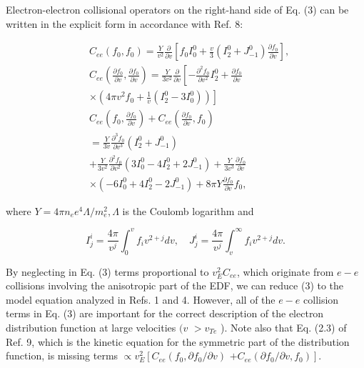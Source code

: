 \documentclass[10pt]{article}
\begin{document}
Electron-electron collisional operators on the right-hand side of Eq. (3) can be written in the explicit form in accordance with Ref. 8:

$$
\begin{aligned}
& C_{e e}\left(f_{0}, f_{0}\right)=\frac{Y}{v^{2}} \frac{\partial}{\partial v}\left[f_{0} I_{0}^{0}+\frac{v}{3}\left(I_{2}^{0}+J_{-1}^{0}\right) \frac{\partial f_{0}}{\partial v}\right], \\
& C_{e e}\left(\frac{\partial f_{0}}{\partial v}, \frac{\partial f_{0}}{\partial v}\right)=\frac{Y}{3 v^{2}} \frac{\partial}{\partial v}\left[-\frac{\partial^{2} f_{0}}{\partial v^{2}} I_{2}^{0}+\frac{\partial f_{0}}{\partial v}\right. \\
& \left.\times\left(4 \pi v^{2} f_{0}+\frac{1}{v}\left(I_{2}^{0}-3 I_{0}^{0}\right)\right)\right] \\
& C_{e e}\left(f_{0}, \frac{\partial f_{0}}{\partial v}\right)+C_{e e}\left(\frac{\partial f_{0}}{\partial v}, f_{0}\right) \\
& =\frac{Y}{3 v} \frac{\partial^{3} f_{0}}{\partial v^{3}}\left(I_{2}^{0}+J_{-1}^{0}\right) \\
& +\frac{Y}{3 v^{2}} \frac{\partial^{2} f_{0}}{\partial v^{2}}\left(3 I_{0}^{0}-4 I_{2}^{0}+2 J_{-1}^{0}\right)+\frac{Y}{3 v^{3}} \frac{\partial f_{0}}{\partial v} \\
& \times\left(-6 I_{0}^{0}+4 I_{2}^{0}-2 J_{-1}^{0}\right)+8 \pi Y \frac{\partial f_{0}}{\partial v} f_{0},
\end{aligned}
$$

where $Y=4 \pi n_{e} e^{4} \Lambda / m_{e}^{2}, \Lambda$ is the Coulomb logarithm and

$$
I_{j}^{i}=\frac{4 \pi}{v^{j}} \int_{0}^{v} f_{i} v^{2+j} d v, \quad J_{j}^{i}=\frac{4 \pi}{v^{j}} \int_{v}^{\infty} f_{i} v^{2+j} d v .
$$

By neglecting in Eq. (3) terms proportional to $v_{E}^{2} C_{e e}$, which originate from $e-e$ collisions involving the anisotropic part of the EDF, we can reduce (3) to the model equation analyzed in Refs. 1 and 4. However, all of the $e-e$ collision terms in Eq. (3) are important for the correct description of the electron distribution function at large velocities $(v$ $>v_{T e}$ ). Note also that Eq. (2.3) of Ref. 9, which is the kinetic equation for the symmetric part of the distribution function, is missing terms $\propto v_{E}^{2}\left[C_{e e}\left(f_{0}, \partial f_{0} / \partial v\right)\right.$ $\left.+C_{e e}\left(\partial f_{0} / \partial v, f_{0}\right)\right]$.
\end{document}
